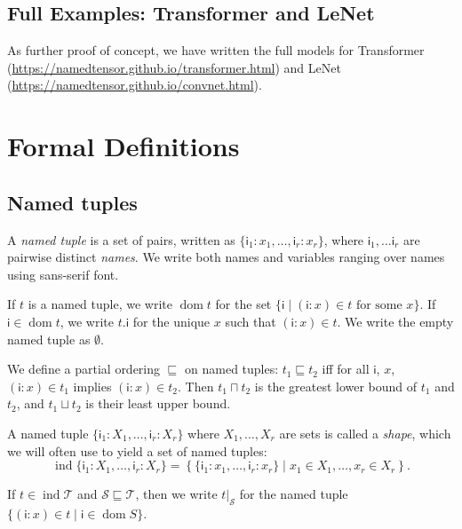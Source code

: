 \documentclass{article}
\newcommand{\name}[1]{\mathsf{#1}}
\newcommand{\tuple}[1]{\{ #1\}}
\DeclareMathOperator{\tupledom}{dom}
\DeclareMathOperator{\tupleshape}{ind}
\newcommand{\tupleproj}[2]{#1.#2}
\newcommand{\tuplerestrict}[2]{\left.#1\right|_{#2}}
\begin{document}
\subsection{Full Examples: Transformer and LeNet}

As further proof of concept, we have written the full models for Transformer (\url{https://namedtensor.github.io/transformer.html}) and LeNet (\url{https://namedtensor.github.io/convnet.html}). 

\section{Formal Definitions}
\label{sec:definitions}

\subsection{Named tuples}

A \emph{named tuple} is a set of pairs, written as $\tuple{\name{i}_1: x_1, \ldots, \name{i}_r: x_r}$, where $\name{i}_1, \ldots \name{i}_r$ are pairwise distinct \emph{names}. We write both names and variables ranging over names using sans-serif font.

If $t$ is a named tuple, we write $\tupledom{t}$ for the set $\{ \name{i} \mid \text{$(\name{i}:x) \in t$ for some $x$} \}$. If $\name{i} \in \tupledom{t}$, we write $\tupleproj{t}{\name{i}}$ for the unique $x$ such that $(\name{i}:x) \in t$. We write the empty named tuple as $\emptyset$.

We define a partial ordering $\sqsubseteq$ on named tuples: $t_1 \sqsubseteq t_2$ iff for all $\name{i}$, $x$, $(\name{i}:x) \in t_1$ implies $(\name{i}:x) \in t_2$. Then $t_1 \sqcap t_2$ is the greatest lower bound of $t_1$ and $t_2$, and $t_1 \sqcup t_2$ is their least upper bound.

A named tuple $\tuple{\name{i}_1: X_1, \ldots, \name{i}_r: X_r}$ where $X_1, \ldots, X_r$ are sets is called a \emph{shape}, which we will often use to yield a set of named tuples:
\begin{equation*}
\tupleshape \tuple{\name{i}_1: X_1, \ldots, \name{i}_r: X_r} = \left\{\tuple{\name{i}_1: x_1, \ldots, \name{i}_r: x_r} \mid x_1 \in X_1, \ldots, x_r \in X_r\right\}.
\end{equation*}

If $t \in \tupleshape \mathcal{T}$ and $\mathcal{S} \sqsubseteq \mathcal{T}$, then we write $\tuplerestrict{t}{\mathcal{S}}$ for the named tuple $\{(\name{i}: x) \in t \mid \name{i} \in \tupledom{S}\}$.
\end{document}
